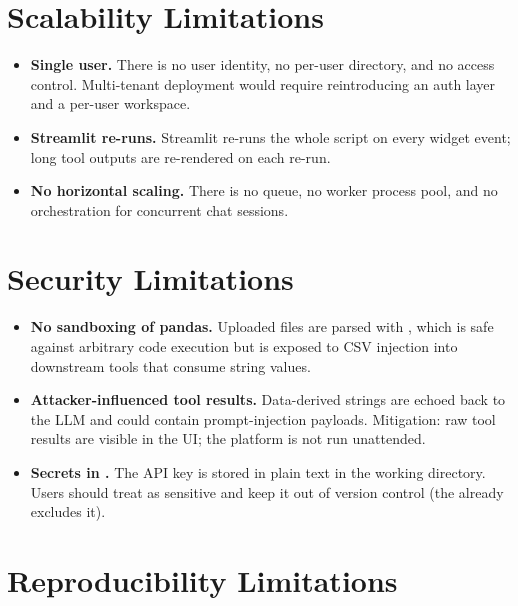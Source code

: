\section{Scalability Limitations}
\label{sec:lim-scale}

\begin{itemize}[leftmargin=1.4em]
  \item \textbf{Single user.} There is no user identity, no
        per-user directory, and no access control. Multi-tenant
        deployment would require reintroducing an auth layer and a
        per-user workspace.
  \item \textbf{Streamlit re-runs.} Streamlit re-runs the whole
        script on every widget event; long tool outputs are
        re-rendered on each re-run.
  \item \textbf{No horizontal scaling.} There is no queue, no
        worker process pool, and no orchestration for concurrent
        chat sessions.
\end{itemize}

\section{Security Limitations}
\label{sec:lim-security}

\begin{itemize}[leftmargin=1.4em]
  \item \textbf{No sandboxing of pandas.} Uploaded files are parsed
        with , which is safe against arbitrary
        code execution but is exposed to CSV injection into
        downstream tools that consume string values.
  \item \textbf{Attacker-influenced tool results.} Data-derived
        strings are echoed back to the LLM and could contain
        prompt-injection payloads. Mitigation: raw tool results are
        visible in the UI; the platform is not run unattended.
  \item \textbf{Secrets in .} The API key is stored in
        plain text in the working directory. Users should treat
         as sensitive and keep it out of version
        control (the  already excludes it).
\end{itemize}

\section{Reproducibility Limitations}
\label{sec:lim-repro}

